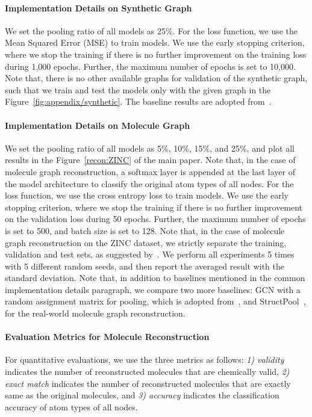 \paragraph{Implementation Details on Synthetic Graph}
We set the pooling ratio of all models as 25\%. For the loss function, we use the Mean Squared Error (MSE) to train models. We use the early stopping criterion, where we stop the training if there is no further improvement on the training loss during 1,000 epochs. Further, the maximum number of epochs is set to 10,000. Note that, there is no other available graphs for validation of the synthetic graph, such that we train and test the models only with the given graph in the Figure~\ref{fig:appendix/synthetic}. The baseline results are adopted from~\citet{MincutPool}.


\paragraph{Implementation Details on Molecule Graph} 
We set the pooling ratio of all models as 5\%, 10\%, 15\%, and 25\%, and plot all results in the Figure~\ref{recon:ZINC} of the main paper. Note that, in the case of molecule graph reconstruction, a softmax layer is appended at the last layer of the model architecture to classify the original atom types of all nodes. For the loss function, we use the cross entropy loss to train models. We use the early stopping criterion, where we stop the training if there is no further improvement on the validation loss during 50 epochs. Further, the maximum number of epochs is set to 500, and batch size is set to 128. Note that, in the case of molecule graph reconstruction on the ZINC dataset, we strictly separate the training, validation and test sets, as suggested by~\citet{benchmarkingGNN}. We perform all experiments 5 times with 5 different random seeds, and then report the averaged result with the standard deviation. Note that, in addition to baselines mentioned in the common implementation details paragraph, we compare two more baselines: GCN with a random assignment matrix for pooling, which is adopted from~\citet{rethinking/pooling}, and StructPool~\citep{StructPool}, for the real-world molecule graph reconstruction.


\paragraph{Evaluation Metrics for Molecule Reconstruction}
For quantitative evaluations, we use the three metrics as follows: \textit{1) validity} indicates the number of reconstructed molecules that are chemically valid, \textit{2) exact match} indicates the number of reconstructed molecules that are exactly same as the original molecules, and \textit{3) accuracy} indicates the classification accuracy of atom types of all nodes.

